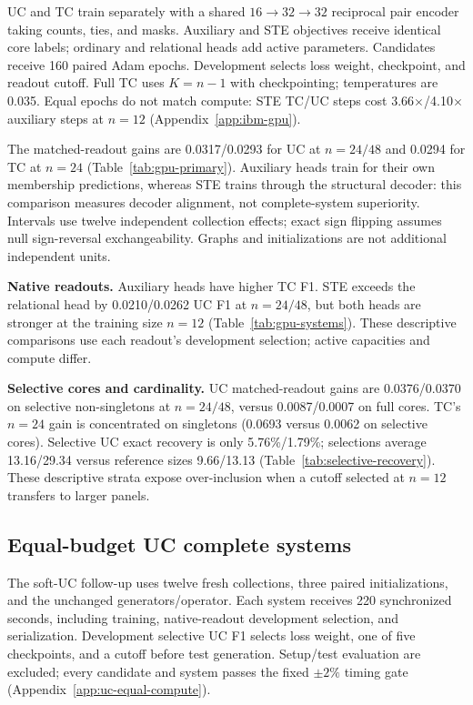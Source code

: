 UC and TC train separately with a shared $16\to32\to32$ reciprocal pair encoder taking counts, ties, and masks. Auxiliary and STE objectives receive identical core labels; ordinary and relational heads add active parameters. Candidates receive 160 paired Adam epochs. Development selects loss weight, checkpoint, and readout cutoff. Full TC uses $K=n-1$ with checkpointing; temperatures are 0.035. Equal epochs do not match compute: STE TC/UC steps cost 3.66$\times$/4.10$\times$ auxiliary steps at $n=12$ (Appendix~\ref{app:ibm-gpu}).



The matched-readout gains are 0.0317/0.0293 for UC at $n=24/48$ and 0.0294 for TC at $n=24$ (Table~\ref{tab:gpu-primary}). Auxiliary heads train for their own membership predictions, whereas STE trains through the structural decoder: this comparison measures decoder alignment, not complete-system superiority. Intervals use twelve independent collection effects; exact sign flipping assumes null sign-reversal exchangeability. Graphs and initializations are not additional independent units.

\textbf{Native readouts.} Auxiliary heads have higher TC F1. STE exceeds the relational head by 0.0210/0.0262 UC F1 at $n=24/48$, but both heads are stronger at the training size $n=12$ (Table~\ref{tab:gpu-systems}). These descriptive comparisons use each readout's development selection; active capacities and compute differ.

\textbf{Selective cores and cardinality.} UC matched-readout gains are 0.0376/0.0370 on selective non-singletons at $n=24/48$, versus 0.0087/0.0007 on full cores. TC's $n=24$ gain is concentrated on singletons (0.0693 versus 0.0062 on selective cores). Selective UC exact recovery is only 5.76\%/1.79\%; selections average 13.16/29.34 versus reference sizes 9.66/13.13 (Table~\ref{tab:selective-recovery}). These descriptive strata expose over-inclusion when a cutoff selected at $n=12$ transfers to larger panels.

\subsection{Equal-budget UC complete systems}\label{sec:equal-compute}
The soft-UC follow-up uses twelve fresh collections, three paired initializations, and the unchanged generators/operator. Each system receives 220 synchronized seconds, including training, native-readout development selection, and serialization. Development selective UC F1 selects loss weight, one of five checkpoints, and a cutoff before test generation. Setup/test evaluation are excluded; every candidate and system passes the fixed $\pm2\%$ timing gate (Appendix~\ref{app:uc-equal-compute}).

